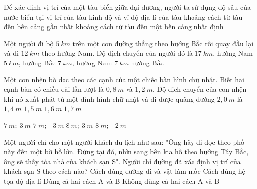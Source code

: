 \begin{ex}%
Để xác định vị trí của một tàu biển giữa đại dương, người ta sử dụng
\choice
{độ sâu của nước biển tại vị trí của tàu}
{\True kinh độ và vĩ độ địa lí của tàu}
{khoảng cách từ tàu đến bến cảng gần nhất}
{khoảng cách từ tàu đến một bến cảng nhất định}
 \end{ex}	
\begin{ex}%
Một người đi bộ $5\ km$ trên một con đường thẳng theo hướng Bắc rồi quay đầu lại và đi $12\ km$ theo hướng Nam. Độ dịch chuyển của người đó là
\choice
{$17\ km$, hướng Nam}
{$5\ km$, hướng Bắc}
{\True $7\ km$, hướng Nam}
{$7\ km$ hướng Bắc}
\loigiai{
}
\end{ex}	
\begin{ex}%
Một con nhện bò dọc theo các cạnh của một chiếc bàn hình chữ nhật. Biết hai cạnh bàn có chiều dài lần lượt là $0,8\ m$ và $1,2\ m$. Độ dịch chuyển của con nhện khi nó xuất phát từ một đỉnh hình chữ nhật và đi được quãng đường $2,0\ m$ là
\choice
{\True $1,4\ m$}
{$1,5\ m$}
{$1,6\ m$}
{$1,7\ m$}
\loigiai{
}
\end{ex}	
\begin{ex}%
\choice
{\True $7\ m;\ 3\ m$}
{$7\ m;-3\ m$}
{$8\ m;\ 3\ m$}
{$8\ m;-2\ m$}
\loigiai{
}
\end{ex}
\begin{ex}%
Một người chỉ cho một người khách du lịch như sau: "Ông hãy đi dọc theo phố này đến một bờ hồ lớn. Đứng tại đó, nhìn sang bên kia hồ theo hướng Tây Bắc, ông sẽ thấy tòa nhà của khách sạn S". Người chỉ đường đã xác định vị trí của khách sạn S theo cách nào?
\choice
{Cách dùng đường đi và vật làm mốc}
{Cách dùng hệ tọa độ địa lí}
{\True Dùng cả hai cách A và B}
{Không dùng cả hai cách A và B}
\loigiai{

}
\end{ex}
